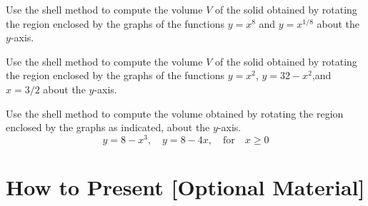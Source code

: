\documentclass[12pt,addpoints, answers, fleqn]{exam}
\begin{document}
\begin{teacher}
\begin{questions}
\question 	%

Use the shell method to compute the volume $V$ of the solid obtained by rotating the region enclosed by the graphs of the functions $y = x^8$ and $y = x^{1/8}$ about the $y$-axis.
 \begin{solution}
\end{solution}
 
\question 	%

Use the shell method to compute the volume $V$ of the solid obtained by rotating the region enclosed by the graphs of the functions $y = x^2$, $y = 32 - x^2$,and $x =  3/2$ about the $y$-axis.
 
 \begin{solution}
\end{solution}
\question 	%

Use the shell method to compute the volume obtained by rotating the region enclosed by the graphs as indicated, about the $y$-axis.
\[
y = 8 - x^3, \quad y = 8 - 4x, \quad \text{for} \quad x \geq 0
\]
\begin{solution}
\end{solution}





\end{questions}
\end{teacher}





\vfill
\pagebreak









\section{How to Present [Optional Material]}
\end{document}
